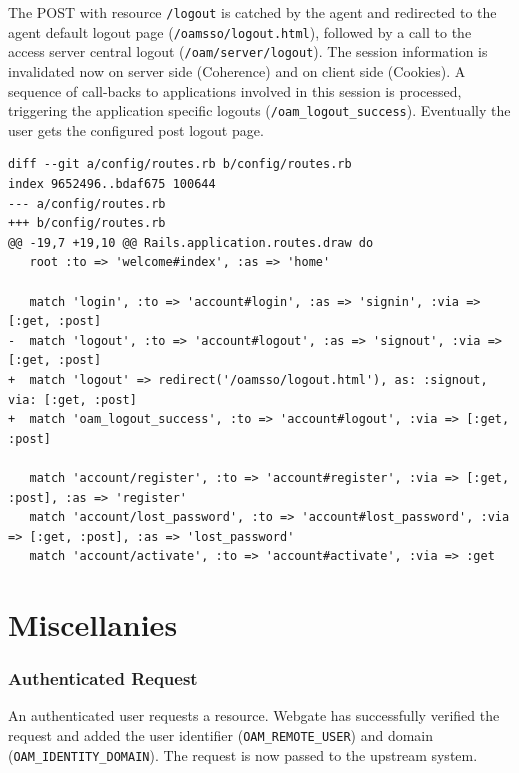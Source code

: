 \documentclass[11pt]{report}
\begin{document}
The POST with resource \verb|/logout| is catched by the agent and redirected to
the agent default logout page (\verb|/oamsso/logout.html|), followed by a call
to the access server central logout (\verb|/oam/server/logout|).  The session
information is invalidated now on server side (Coherence) and on client side
(Cookies).  A sequence of call-backs to applications involved in this session
is processed, triggering the application specific logouts
(\verb|/oam_logout_success|).  Eventually the user gets the configured post
logout page.


\begin{Verbatim}[label=Changes for Logout]
diff --git a/config/routes.rb b/config/routes.rb
index 9652496..bdaf675 100644
--- a/config/routes.rb
+++ b/config/routes.rb
@@ -19,7 +19,10 @@ Rails.application.routes.draw do
   root :to => 'welcome#index', :as => 'home'

   match 'login', :to => 'account#login', :as => 'signin', :via => [:get, :post]
-  match 'logout', :to => 'account#logout', :as => 'signout', :via => [:get, :post]
+  match 'logout' => redirect('/oamsso/logout.html'), as: :signout, via: [:get, :post]
+  match 'oam_logout_success', :to => 'account#logout', :via => [:get, :post]

   match 'account/register', :to => 'account#register', :via => [:get, :post], :as => 'register'
   match 'account/lost_password', :to => 'account#lost_password', :via => [:get, :post], :as => 'lost_password'
   match 'account/activate', :to => 'account#activate', :via => :get
\end{Verbatim}



\chapter{Miscellanies}


\subsection{Authenticated Request}

An authenticated user requests a resource. Webgate has successfully verified the
request and added the user identifier (\verb|OAM_REMOTE_USER|) and domain
(\verb|OAM_IDENTITY_DOMAIN|). The request is now passed to the upstream system.
\end{document}

